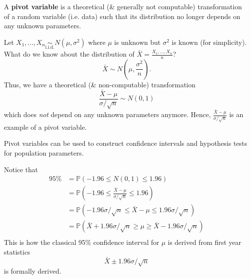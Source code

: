 \begin{definition}\label{defn:pivot var}
    A \textbf{pivot variable} is a theoretical (\& generally not computable) transformation of a random variable (i.e. data) such that its distribution no longer depends on any unknown parameters. 
\end{definition}

\begin{example}\label{eg:pivot var normal}
    Let \(X_1,...,X_n \underset{\text{i.i.d.}}{\sim} N(\mu,\sigma^2)\) where \(\mu\) is unknown but \(\sigma^2\) is known (for simplicity). 
    What do we know about the distribution of \(\bar{X} = \frac{X_1,...,X_n}{n}\)?
    \begin{equation*}
        \bar{X}\sim N(\mu,\frac{\sigma^2}{n}).
    \end{equation*}
    Thus, we have a theoretical (\& non-computable) transformation 
    \begin{equation*}
        \frac{\bar{X} - \mu}{\sigma/\sqrt{n}} \sim N(0,1)
    \end{equation*}
    which does \textit{not} depend on any unknown parameters anymore. 
    Hence, \(\frac{\bar{X} - \mu}{\sigma/\sqrt{n}}\) is an example of a pivot variable. 
\end{example}

Pivot variables can be used to construct confidence intervals and hypothesis tests for population parameters. 

\begin{example}\label{eg:pivot var normal continued}
    Notice that 
    \begin{align*}
        95\% &= \mathbb{P}(-1.96 \leq N(0,1) \leq 1.96)\\
        &= \mathbb{P}(-1.96 \leq \frac{\bar{X} - \mu}{\sigma/\sqrt{n}} \leq 1.96)\\
        &= \mathbb{P}(-1.96\sigma/\sqrt{n} \leq \bar{X} - \mu \leq 1.96\sigma/\sqrt{n})\\
        &= \mathbb{P}(\bar{X}+1.96\sigma/\sqrt{n} \geq \mu \geq \bar{X}-1.96\sigma/\sqrt{n})\\
    \end{align*}
    This is how the classical 95\% confidence interval for \(\mu\) is derived from first year statistics
    \begin{equation*}
        \bar{X}\pm 1.96\sigma/\sqrt{n}
    \end{equation*}
    is formally derived. 
\end{example}

